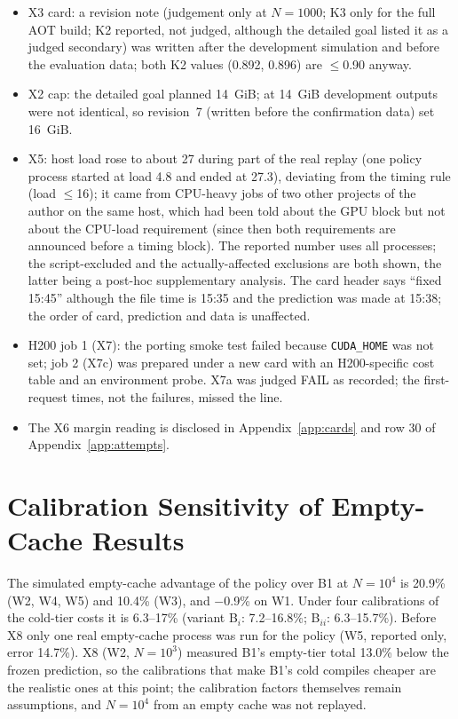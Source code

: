 \documentclass[conference]{IEEEtran}
\newcommand{\tn}[1]{#1}%
\begin{document}
\begin{itemize}
\item X3 card: a revision note (judgement only at $N{=}1000$; K3 only for the full AOT build; K2 reported, not judged, although the detailed goal listed it as a judged secondary) was written after the development simulation and before the evaluation data; both K2 values (\tn{0.892}, \tn{0.896}) are $\le$0.90 anyway.
\item X2 cap: the detailed goal planned 14~GiB; at 14~GiB development outputs were not identical, so revision~7 (written before the confirmation data) set 16~GiB.
\item X5: host load rose to about 27 during part of the real replay (one policy process started at load 4.8 and ended at 27.3), deviating from the timing rule (load $\le$16); it came from CPU-heavy jobs of two other projects of the author on the same host, which had been told about the GPU block but not about the CPU-load requirement (since then both requirements are announced before a timing block). The reported number uses all processes; the script-excluded and the actually-affected exclusions are both shown, the latter being a post-hoc supplementary analysis. The card header says ``fixed 15:45'' although the file time is 15:35 and the prediction was made at 15:38; the order of card, prediction and data is unaffected.
\item H200 job 1 (X7): the porting smoke test failed because \texttt{CUDA\_HOME} was not set; job 2 (X7c) was prepared under a new card with an H200-specific cost table and an environment probe. X7a was judged FAIL as recorded; the first-request times, not the failures, missed the line.
\item The X6 margin reading is disclosed in Appendix~\ref{app:cards} and row 30 of Appendix~\ref{app:attempts}.
\end{itemize}

\section{Calibration Sensitivity of Empty-Cache Results}\label{app:calib}
The simulated empty-cache advantage of the policy over B1 at $N{=}10^4$ is \tn{20.9\%} (W2, W4, W5) and \tn{10.4\%} (W3), and \tn{$-$0.9\%} on W1. Under four calibrations of the cold-tier costs it is \tn{6.3--17\%} (variant B$_i$: \tn{7.2--16.8\%}; B$_{ii}$: \tn{6.3--15.7\%}). Before X8 only one real empty-cache process was run for the policy (W5, reported only, error \tn{14.7\%}). X8 (W2, $N{=}10^3$) measured B1's empty-tier total \tn{13.0\%} below the frozen prediction, so the calibrations that make B1's cold compiles cheaper are the realistic ones at this point; the calibration factors themselves remain assumptions, and $N{=}10^4$ from an empty cache was not replayed.
\end{document}
